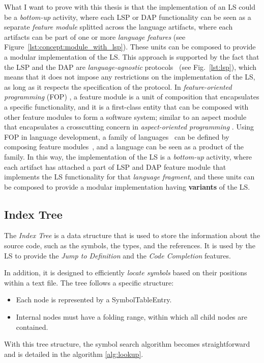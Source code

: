 What I want to prove with this thesis is that the implementation of an LS could be a \textit{bottom-up} activity, where each LSP or DAP functionality can be seen as a separate \textit{feature module} \cite{Batory04, Kastner11} splitted across the language artifacts, where each artifacts can be part of one or more \textit{language features} (see Figure~\ref{lst:concept:module_with_lsp}). These units can be composed to provide a modular implementation of the LS. This approach is supported by the fact that the LSP and the DAP are \textit{language-agnostic} protocols~\cite{Niephaus20, Rodriguez-Echeverria18} (see Fig.~\ref{lst:lsp}), which means that it does not impose any restrictions on the implementation of the LS, as long as it respects the specification of the protocol.
In \textit{feature-oriented programming} (FOP) \cite{Apel13, Czarnecki04, Prehofer01}, a feature module is a unit of composition that encapsulates a specific functionality, and it is a first-class entity that can be composed with other feature modules to form a software system; similar to an aspect module that encapsulates a crosscutting concern in \textit{aspect-oriented programming} \cite{Kiczales01, Kiczales97, Laddad03}. Using FOP in language development, a family of languages~\cite{Liebig13} can be defined by composing feature modules~\cite{Wende09}, and a language can be seen as a product of the family.
In this way, the implementation of the LS is a \textit{bottom-up} activity, where each artifact has attached a part of LSP and DAP feature module that implements the LS functionality for that \textit{language fragment}, and these units can be composed to provide a modular implementation having \textbf{variants} of the LS.

\subsection{Index Tree}\label{subsec:concept:IndexTree}

The \textit{Index Tree} is a data structure that is used to store the information about the source code, such as the symbols, the types, and the references. It is used by the LS to provide the \textit{Jump to Definition} and the \textit{Code Completion} features.

 In addition, it is designed to efficiently \textit{locate symbols} based on their positions within a text file. The tree follows a specific structure:
\begin{itemize}
    \item Each node is represented by a SymbolTableEntry.
    \item Internal nodes must have a folding range, within which all child nodes are contained.
\end{itemize}
With this tree structure, the symbol search algorithm becomes straightforward and is detailed in the algorithm \ref{alg:lookup}.

